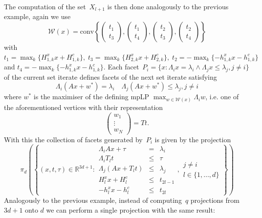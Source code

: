 \documentclass{elsarticle}
\providecommand{\conv}{\text{conv}}
\theoremstyle{remark}
\theoremstyle{definition}
\begin{document}
The computation of the set~$X_{l+1}$ is then done analogously to the previous example, again we use 
%
$$
  \mathcal W(x) = \conv\left\{\begin{pmatrix}t_1\\ t_3\end{pmatrix},\begin{pmatrix}t_1\\ t_4\end{pmatrix},
  \begin{pmatrix} t_2\\ t_3\end{pmatrix},\begin{pmatrix}t_2\\ t_4\end{pmatrix}
  \right\}
$$
%
with $t_1=\max_k\{H_{1,k}^x x+H_{1,k}^c\},\; t_3=\max_k\{H_{2,k}^x x+H_{2,k}^c\},\; t_2=-\max_k\{-h_{1,k}^x x-h_{1,k}^c\}$ and $t_4=-\max_k\{-h_{1,k}^x x-h_{1,k}^c\}$.
%
Each facet~$P_i=\{x:\Lambda_i x=\lambda_i\wedge\Lambda_jx\leq\lambda_j,j\neq i\}$ of the current set iterate defines facets of the next set iterate satisfying
%
\begin{equation}
\Lambda_i(Ax+w^\ast)=\lambda_i\quad \Lambda_j(Ax+w^\ast)\leq\lambda_j,j\neq i
\end{equation}
%
where $w^\ast$ is the maximiser of the defining mpLP $\max_{w\in\mathcal W(x)}\Lambda_iw$, i.e. one of the aforementioned vertices with their representation
%
$$
  \begin{pmatrix} w_1\\ \vdots \\ w_N\end{pmatrix}= Tt.
$$
%
With this the collection of facets generated by~$P_i$ is given by the projection
%
\begin{equation}
  \pi_d\left(\left\{(x,t,\tau)\in\mathbb R^{3d+1}:\begin{array}{rcl}
  \Lambda_iAx+\tau&=&\lambda_i\\
  \Lambda_i T_lt&\leq&\tau\\
  \Lambda_j(Ax+T_lt)&\leq&\lambda_j\\
  H_l^x x + H_l^c&\leq&t_{2l-1}\\
  -h_l^x x - h_l^c&\leq&t_{2l}
  \end{array}, \begin{array}{l}
  j\neq i\\
  l\in\{1,\dots,d\}\end{array}
  \right\}\right)
\end{equation}
%
Analogously to the previous example, instead of computing~$q$ projections from $3d+1$ onto $d$ we can perform a single projection with the same result:
\end{document}

